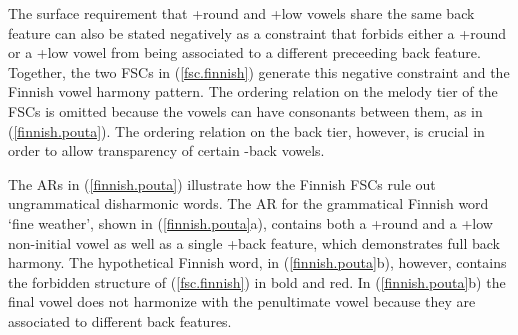\documentclass[,doc,floatsintext]{apa6}
\theoremstyle{definition}
\theoremstyle{definition}
\theoremstyle{definition}
\theoremstyle{remark}
\begin{document}
The surface requirement that +round and +low vowels share the same back
feature can also be stated negatively as a constraint that forbids
either a +round or a +low vowel from being associated to a different
preceeding back feature. Together, the two FSCs in (\ref{fsc.finnish})
generate this negative constraint and the Finnish vowel harmony pattern.
The ordering relation on the melody tier of the FSCs is omitted because
the vowels can have consonants between them, as in
(\ref{finnish.pouta}). The ordering relation on the back tier, however,
is crucial in order to allow transparency of certain -back vowels.

\begin{exe}
\ex \label{fsc.finnish}
\end{exe}

The ARs in (\ref{finnish.pouta}) illustrate how the Finnish FSCs rule
out ungrammatical disharmonic words. The AR for the grammatical Finnish
word \textipa{[poutA]} `fine weather', shown in (\ref{finnish.pouta}a),
contains both a +round and a +low non-initial vowel as well as a single
+back feature, which demonstrates full back harmony. The hypothetical
Finnish word, \textipa{[pout\ae]} in (\ref{finnish.pouta}b), however,
contains the forbidden structure of (\ref{fsc.finnish}) in bold and red.
In (\ref{finnish.pouta}b) the final vowel does not harmonize with the
penultimate vowel because they are associated to different back
features.
\end{document}
